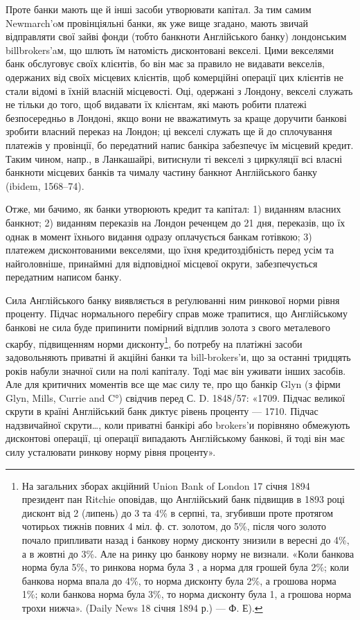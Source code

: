 
Проте банки мають ще й інші засоби утворювати капітал. За тим самим
Newmarch’oм провінціяльні банки, як уже вище згадано, мають звичай відправляти
свої зайві фонди (тобто банкноти Англійського банку) лондонським billbrokers'aм,
що шлють їм натомість дисконтовані векселі. Цими векселями банк
обслуговує своїх клієнтів, бо він має за правило не видавати векселів, одержаних
від своїх місцевих клієнтів, щоб комерційні операції цих клієнтів не стали відомі
в їхній власній місцевості. Оці, одержані з Лондону, векселі служать не тільки
до того, щоб видавати їх клієнтам, які мають робити платежі безпосередньо
в Лондоні, якщо вони не вважатимуть за краще доручити банкові зробити
власний переказ на Лондон; ці векселі служать ще й до сплочування платежів
у провінції, бо передатний напис банкіра забезпечує їм місцевий кредит. Таким
чином, напр., в Ланкашайрі, витиснули ті векселі з циркуляції всі власні банкноти
місцевих банків та чималу частину банкнот Англійського банку (ibidem,
1568--74).

Отже, ми бачимо, як банки утворюють кредит та капітал: 1) виданням
власних банкнот; 2) виданням переказів на Лондон реченцем до 21 дня, переказів,
що їх однак в момент їхнього видання одразу оплачується банкам готівкою;
3) платежем дисконтованими векселями, що їхня кредитоздібність перед
усім та найголовніше, принаймні для відповідної місцевої округи, забезпечується
передатним написом банку.

Сила Англійського банку виявляється в реґулюванні ним ринкової норми
рівня проценту. Підчас нормального перебігу справ може трапитися, що Англійському
банкові не сила буде припинити помірний відплив золота з свого металевого
скарбу, підвищенням норми дисконту\footnote{
На загальних зборах акційний Union Bank of London 17 січня 1894 президент пан Ritchie
оповідав, що Англійський банк підвищив в 1893 році дисконт від 2 (липень) до 3 та 4\% в серпні,
та, згубивши проте протягом чотирьох тижнів повних 4 міл. ф. ст. золотом, до 5\%, після чого
золото почало припливати назад і банкову норму дисконту знизили в вересні до 4\%, а в жовтні до 3\%.
Але на ринку цю банкову норму не визнали. «Коли банкова норма була 5\%, то ринкова норма була З ,
а норма для грошей була 2\%; коли банкова норма впала до 4\%, то норма дисконту була 2\%, а
грошова норма 1\%; коли банкова норма була 3\%, то норма дисконту була 1, а грошова норма
трохи нижча». (Daily News 18 січня 1894 р.) — Ф. Е).
}, бо потребу на платіжні засоби
задовольняють приватні й акційні банки та bill-brokers’и, що за останні тридцять
років набули значної сили на полі капіталу. Тоді має він уживати інших
засобів. Але для критичних моментів все ще має силу те, про що банкір Glyn
(з фірми Glyn, Mills, Currie and C°) свідчив перед С. D. 1848/57: «1709. Підчас
великої скрути в країні Англійський банк диктує рівень проценту — 1710. Підчас
надзвичайної скрути\dots{}, коли приватні банкірі або brokers’и порівняно обмежують
дисконтові операції, ці операції випадають Англійському банкові, й тоді він має
силу усталювати ринкову норму рівня проценту».

